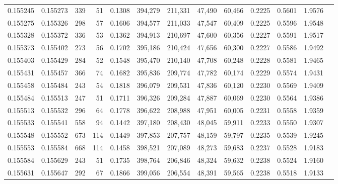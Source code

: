 \begin{tabular}{rrrrrrrrrrrrr}
0.155245 & 0.155273 &   339 &  51 &                                     0.1308 & 394,279 & 211,331 &  47,490 &  60,466 & 0.2225 & 0.5601 & 1.9576 \\
0.155275 & 0.155326 &   298 &  57 &                                     0.1606 & 394,577 & 211,033 &  47,547 &  60,409 & 0.2225 & 0.5596 & 1.9548 \\
0.155328 & 0.155372 &   336 &  53 &                                     0.1362 & 394,913 & 210,697 &  47,600 &  60,356 & 0.2227 & 0.5591 & 1.9517 \\
0.155373 & 0.155402 &   273 &  56 &                                     0.1702 & 395,186 & 210,424 &  47,656 &  60,300 & 0.2227 & 0.5586 & 1.9492 \\
0.155403 & 0.155429 &   284 &  52 &                                     0.1548 & 395,470 & 210,140 &  47,708 &  60,248 & 0.2228 & 0.5581 & 1.9465 \\
0.155431 & 0.155457 &   366 &  74 &                                     0.1682 & 395,836 & 209,774 &  47,782 &  60,174 & 0.2229 & 0.5574 & 1.9431 \\
0.155458 & 0.155484 &   243 &  54 &                                     0.1818 & 396,079 & 209,531 &  47,836 &  60,120 & 0.2230 & 0.5569 & 1.9409 \\
0.155484 & 0.155513 &   247 &  51 &                                     0.1711 & 396,326 & 209,284 &  47,887 &  60,069 & 0.2230 & 0.5564 & 1.9386 \\
0.155513 & 0.155532 &   296 &  64 &                                     0.1778 & 396,622 & 208,988 &  47,951 &  60,005 & 0.2231 & 0.5558 & 1.9359 \\
0.155533 & 0.155541 &   558 &  94 &                                     0.1442 & 397,180 & 208,430 &  48,045 &  59,911 & 0.2233 & 0.5550 & 1.9307 \\
0.155548 & 0.155552 &   673 & 114 &                                     0.1449 & 397,853 & 207,757 &  48,159 &  59,797 & 0.2235 & 0.5539 & 1.9245 \\
0.155553 & 0.155584 &   668 & 114 &                                     0.1458 & 398,521 & 207,089 &  48,273 &  59,683 & 0.2237 & 0.5528 & 1.9183 \\
0.155584 & 0.155629 &   243 &  51 &                                     0.1735 & 398,764 & 206,846 &  48,324 &  59,632 & 0.2238 & 0.5524 & 1.9160 \\
0.155631 & 0.155647 &   292 &  67 &                                     0.1866 & 399,056 & 206,554 &  48,391 &  59,565 & 0.2238 & 0.5518 & 1.9133 \\

\end{tabular}
